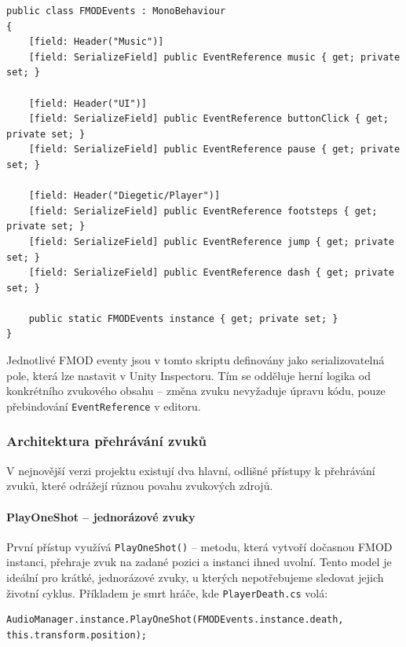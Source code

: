 \begin{lstlisting}[caption={FMODEvents -- centrální registr téměř všech FMOD eventů}, label={lst:fmodevents}]
public class FMODEvents : MonoBehaviour
{
    [field: Header("Music")]
    [field: SerializeField] public EventReference music { get; private set; }

    [field: Header("UI")]
    [field: SerializeField] public EventReference buttonClick { get; private set; }
    [field: SerializeField] public EventReference pause { get; private set; }

    [field: Header("Diegetic/Player")]
    [field: SerializeField] public EventReference footsteps { get; private set; }
    [field: SerializeField] public EventReference jump { get; private set; }
    [field: SerializeField] public EventReference dash { get; private set; }

    public static FMODEvents instance { get; private set; }
}
\end{lstlisting}

Jednotlivé FMOD eventy jsou v tomto skriptu definovány jako serializovatelná pole, která lze nastavit v Unity Inspectoru. Tím se odděluje herní logika od konkrétního zvukového obsahu -- změna zvuku nevyžaduje úpravu kódu, pouze přebindování \texttt{EventReference} v editoru.

\subsubsection{Architektura přehrávání zvuků}
\label{sec:architektura-prehravani}

V nejnovější verzi projektu existují dva hlavní, odlišné přístupy k přehrávání zvuků, které odrážejí různou povahu zvukových zdrojů.

\paragraph{PlayOneShot -- jednorázové zvuky}
První přístup využívá \texttt{PlayOneShot()} -- metodu, která vytvoří dočasnou FMOD instanci, přehraje zvuk na zadané pozici a instanci ihned uvolní. Tento model je ideální pro krátké, jednorázové zvuky, u kterých nepotřebujeme sledovat jejich životní cyklus. Příkladem je smrt hráče,   kde \texttt{PlayerDeath.cs} volá:

\begin{lstlisting}[caption={PlayOneShot -- jednorázový zvuk}, label={lst:playoneshot}]
AudioManager.instance.PlayOneShot(FMODEvents.instance.death, this.transform.position);
\end{lstlisting}


